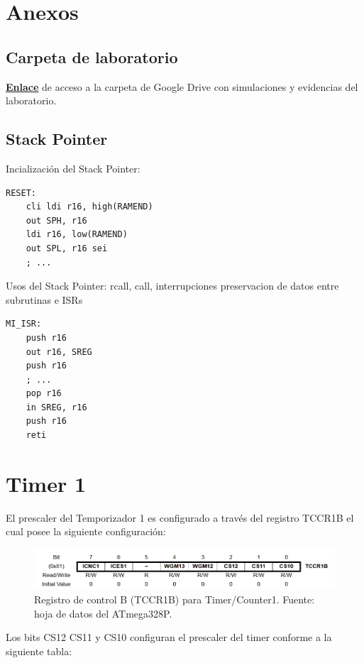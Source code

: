 \section{Anexos}
\subsection{Carpeta de laboratorio}
\href{https://drive.google.com/drive/folders/1-pCu1uoGqFwTV82Zj6AoLYSWdHQhPP2F?usp=drive_link}{\textbf{Enlace}} de acceso a la carpeta de Google Drive con simulaciones y evidencias del laboratorio.


\subsection{Stack Pointer}

Incialización del Stack Pointer:

\begin{verbatim}
RESET:
    cli ldi r16, high(RAMEND)
    out SPH, r16
    ldi r16, low(RAMEND)
    out SPL, r16 sei
    ; ...
\end{verbatim}

Usos del Stack Pointer: rcall, call, interrupciones
preservacion de datos entre subrutinas e ISRs

\begin{verbatim}
MI_ISR:
    push r16
    out r16, SREG
    push r16
    ; ... 
    pop r16
    in SREG, r16
    push r16
    reti
\end{verbatim}

\section{Timer 1}

El prescaler del Temporizador 1 es configurado a través del registro TCCR1B el cual posee la siguiente configuración:

\begin{figure}[H]
  \centering
  \includegraphics[width=\linewidth]{./Anexos/Marco Teorico/Timers/TCCR1B.png}
  \caption{Registro de control B (TCCR1B) para Timer/Counter1. Fuente: hoja de datos del ATmega328P\@\cite{atmega328p_datasheet}.}
  \label{fig:TCCR1B}
\end{figure}

Los bits CS12 CS11 y CS10 configuran el prescaler del timer conforme a la siguiente tabla: 

